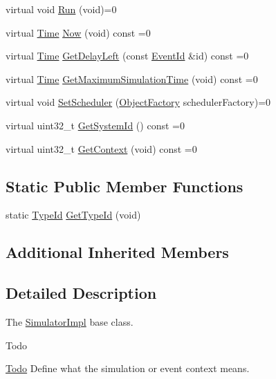 \begin{DoxyCompactItemize}
\item 
virtual void \hyperlink{classns3_1_1SimulatorImpl_a4b5de814986948cca3658a84c9d671f6}{Run} (void)=0
\item 
virtual \hyperlink{classns3_1_1Time}{Time} \hyperlink{classns3_1_1SimulatorImpl_aa516c50060846adc6fd316e83ef0797c}{Now} (void) const =0
\item 
virtual \hyperlink{classns3_1_1Time}{Time} \hyperlink{classns3_1_1SimulatorImpl_a0a8e0885c0f98fa3e07ede4bcc79dccb}{Get\+Delay\+Left} (const \hyperlink{classns3_1_1EventId}{Event\+Id} \&id) const =0
\item 
virtual \hyperlink{classns3_1_1Time}{Time} \hyperlink{classns3_1_1SimulatorImpl_a07b16567e2ec50ab91d5e00b98f31a22}{Get\+Maximum\+Simulation\+Time} (void) const =0
\item 
virtual void \hyperlink{classns3_1_1SimulatorImpl_a15cc88b2e2cd711b5ec503ad8ec517dc}{Set\+Scheduler} (\hyperlink{classns3_1_1ObjectFactory}{Object\+Factory} scheduler\+Factory)=0
\item 
virtual uint32\+\_\+t \hyperlink{classns3_1_1SimulatorImpl_a16b1ae89947d862b421d98a702bac03b}{Get\+System\+Id} () const =0
\item 
virtual uint32\+\_\+t \hyperlink{classns3_1_1SimulatorImpl_a8b66270c97766c0adb997e2535648557}{Get\+Context} (void) const =0
\end{DoxyCompactItemize}
\subsection*{Static Public Member Functions}
\begin{DoxyCompactItemize}
\item 
static \hyperlink{classns3_1_1TypeId}{Type\+Id} \hyperlink{classns3_1_1SimulatorImpl_a37d8346f701a515f340546ac24fe1ed7}{Get\+Type\+Id} (void)
\end{DoxyCompactItemize}
\subsection*{Additional Inherited Members}


\subsection{Detailed Description}
The \hyperlink{classns3_1_1SimulatorImpl}{Simulator\+Impl} base class.

\begin{DoxyRefDesc}{Todo}
\item[\hyperlink{todo__todo000007}{Todo}]Define what the simulation or event context means. \end{DoxyRefDesc}


